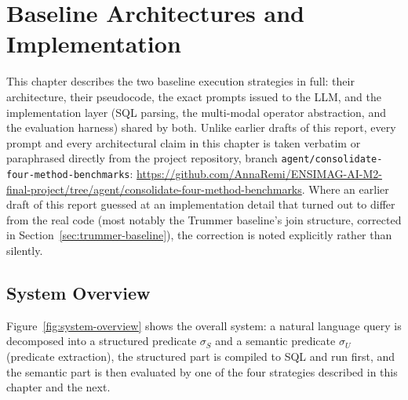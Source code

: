 \chapter{Baseline Architectures and Implementation}
\label{chap:architecture}

This chapter describes the two baseline execution strategies in full:
their architecture, their pseudocode, the exact prompts issued to the
LLM, and the implementation layer (SQL parsing, the multi-modal operator
abstraction, and the evaluation harness) shared by both. Unlike earlier
drafts of this report, every prompt and every architectural claim in
this chapter is taken verbatim or paraphrased directly from the project
repository, branch \texttt{agent/consolidate-four-method-benchmarks}:
\url{https://github.com/AnnaRemi/ENSIMAG-AI-M2-final-project/tree/agent/consolidate-four-method-benchmarks}.
Where an earlier draft of this report guessed at an implementation
detail that turned out to differ from the real code (most notably the
Trummer baseline's join structure, corrected in
Section~\ref{sec:trummer-baseline}), the correction is noted explicitly
rather than silently.

\section{System Overview}

Figure~\ref{fig:system-overview} shows the overall system: a natural
language query is decomposed into a structured predicate $\sigma_S$ and a
semantic predicate $\sigma_U$ (predicate extraction), the structured part
is compiled to SQL and run first, and the semantic part is then evaluated
by one of the four strategies described in this chapter and the next.

